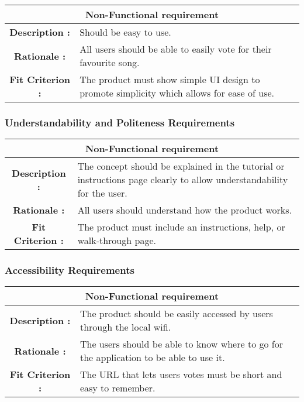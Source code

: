 \documentclass[12pt, titlepage]{article}
\begin{document}
\begin{center}
\begin{table}[H]
\begin{tabularx}{\textwidth}{| c X |}
\hline
\multicolumn{2}{|c|}{\textbf{Non-Functional requirement}}\\
\hline
\textbf{Description : } & Should be easy to use.\\
\hline
\textbf{Rationale : } & All users should be able to easily vote for their favourite song.\\
\hline
\textbf{Fit Criterion : } & The product must show simple UI design to promote simplicity which allows for ease of use.\\
\hline
\end{tabularx}
\end{table}
\end{center}

\subsubsection{Understandability and Politeness Requirements}

\begin{center}
\begin{table}[H]
\begin{tabularx}{\textwidth}{| c X |}
\hline
\multicolumn{2}{|c|}{\textbf{Non-Functional requirement}}\\
\hline
\textbf{Description : } & The concept should be explained in the tutorial or instructions page clearly to allow understandability for the user.\\
\hline
\textbf{Rationale : } & All users should understand how the product works.\\
\hline
\textbf{Fit Criterion : } & The product must include an instructions, help, or walk-through page.\\
\hline
\end{tabularx}
\end{table}
\end{center}

\subsubsection{Accessibility Requirements}

\begin{center}
\begin{table}[H]
\begin{tabularx}{\textwidth}{| c X |}
\hline
\multicolumn{2}{|c|}{\textbf{Non-Functional requirement}}\\
\hline
\textbf{Description : } & The product should be easily accessed by users through the local wifi.\\
\hline
\textbf{Rationale : } & The users should be able to know where to go for the application to be able to use it.\\
\hline
\textbf{Fit Criterion : } & The URL that lets users votes must be short and easy to remember.\\
\hline
\end{tabularx}
\end{table}
\end{center}
\end{document}
